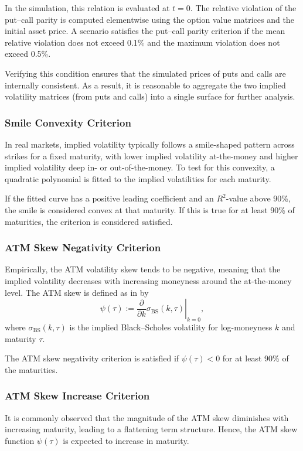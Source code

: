 In the simulation, this relation is evaluated at \( t = 0 \). The relative violation of the put–call parity is computed elementwise using the option value matrices and the initial asset price. A scenario satisfies the put–call parity criterion if the mean relative violation does not exceed 0.1\% and the maximum violation does not exceed 0.5\%.

Verifying this condition ensures that the simulated prices of puts and calls are internally consistent. As a result, it is reasonable to aggregate the two implied volatility matrices (from puts and calls) into a single surface for further analysis.


\subsubsection*{Smile Convexity Criterion}
In real markets, implied volatility typically follows a smile-shaped pattern across strikes for a fixed maturity, with lower implied volatility at-the-money and higher implied volatility deep in- or out-of-the-money. To test for this convexity, a quadratic polynomial is fitted to the implied volatilities for each maturity.

If the fitted curve has a positive leading coefficient and an \( R^2 \)-value above 90\%, the smile is considered convex at that maturity. If this is true for at least 90\% of maturities, the criterion is considered satisfied.

\subsubsection*{ATM Skew Negativity Criterion}
Empirically, the ATM volatility skew tends to be negative, meaning that the implied volatility decreases with increasing moneyness around the at-the-money level. The ATM skew is defined as in \citet{Gatheral2024} by
\begin{equation} \label{eq:ATMSkew}
    \psi(\tau) := \left. \frac{\partial}{\partial k} \sigma_{\text{BS}}(k, \tau) \right|_{k = 0},
\end{equation}
where $\sigma_{\text{BS}}(k, \tau)$ is the implied Black–Scholes volatility for log-moneyness $k$ and maturity $\tau$.

The ATM skew negativity criterion is satisfied if $\psi(\tau) < 0$ for at least 90\% of the maturities.

\subsubsection*{ATM Skew Increase Criterion}
It is commonly observed that the magnitude of the ATM skew diminishes with increasing maturity, leading to a flattening term structure. Hence, the ATM skew function $\psi(\tau)$ is expected to increase in maturity.

